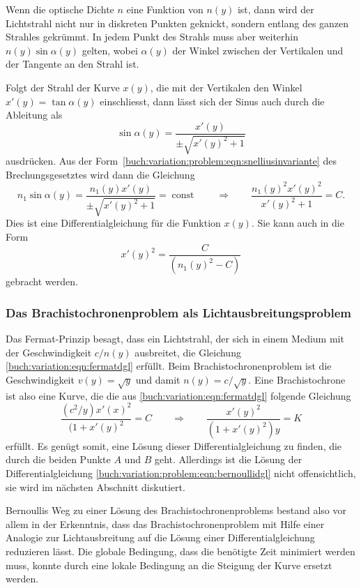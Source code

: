 Wenn die optische Dichte $n$ eine Funktion von $n(y)$ ist, dann
wird der Lichtstrahl nicht nur in diskreten Punkten geknickt, sondern
entlang des ganzen Strahles gekrümmt.
In jedem Punkt des Strahls muss aber weiterhin $n(y)\sin\alpha(y)$
gelten, wobei $\alpha(y)$ der Winkel zwischen der Vertikalen und
der Tangente an den Strahl ist.

Folgt der Strahl der Kurve $x(y)$, die mit der Vertikalen den Winkel
$x'(y) = \tan\alpha(y)$ einschliesst, dann lässt sich der Sinus
auch durch die Ableitung als
\[
\sin\alpha(y)
=
\frac{x'(y)}{\pm\!\sqrt{x'(y)^2+1}}
\]
ausdrücken.
Aus der Form~\eqref{buch:variation:problem:eqn:snelliusinvariante}
des Brechungsgesetztes wird dann die Gleichung
\begin{equation}
n_1\sin\alpha(y)
=
\frac{n_1(y)x'(y)}{\pm\!\sqrt{x'(y)^2+1}}
=
\operatorname{const}
\qquad\Rightarrow\qquad
\frac{n_1(y)^2x'(y)^2}{x'(y)^2+1}=C.
\label{buch:variation:eqn:fermatdgl}
\end{equation}
Dies ist eine Differentialgleichung für die Funktion $x(y)$.
Sie kann auch in die Form
\[
x'(y)^2
=
\frac{C}{(n_1(y)^2-C)}
\]
gebracht werden.

%
%
\subsubsection{Das Brachistochronenproblem als Lichtausbreitungsproblem}
Das Fermat-Prinzip besagt, dass ein Lichtstrahl, der sich in einem Medium
mit der Geschwindigkeit $c/n(y)$ ausbreitet, die Gleichung 
\eqref{buch:variation:eqn:fermatdgl} erfüllt.
Beim Brachistochronenproblem ist die Geschwindigkeit $v(y)=\!\sqrt{y}$ und 
damit $n(y) = c/\!\sqrt{y}$.
Eine Brachistochrone ist also eine Kurve, die die aus
\eqref{buch:variation:eqn:fermatdgl} folgende Gleichung
\begin{equation}
\frac{(c^2/y) x'(x)^2}{(1+x'(y)^2}
=
C
\qquad\Rightarrow\qquad
\frac{x'(y)^2}{(1+x'(y)^2)y}
=
K
\label{buch:variation:problem:eqn:bernoullidgl}
\end{equation}
erfüllt.
Es genügt somit, eine Lösung dieser Differentialgleichung zu finden,
die durch die beiden Punkte $A$ und $B$ geht.
Allerdings ist die Lösung der Differentialgleichung
\eqref{buch:variation:problem:eqn:bernoullidgl}
nicht offensichtlich, sie wird im nächsten Abschnitt diskutiert.

Bernoullis Weg zu einer Lösung des Brachistochronenproblems bestand
also vor allem in der Erkenntnis, dass das Brachistochronenproblem mit
Hilfe einer Analogie zur Lichtausbreitung auf die Lösung einer
Differentialgleichung reduzieren lässt.
Die globale Bedingung, dass die benötigte Zeit minimiert werden muss,
konnte durch eine lokale Bedingung an die Steigung der Kurve ersetzt
werden.

